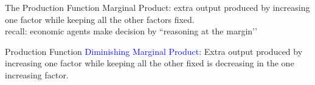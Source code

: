 \documentclass[notes,11pt, aspectratio=169, xcolor=table]{beamer}
\begin{document}
\begin{frame}{The Production Function}
  \huge{Marginal Product: extra output produced by increasing one factor while keeping all the other factors fixed.} \\
  \vspace{20pt}
  \Large{recall: economic agents make decision by ``reasoning at the margin’’}
\end{frame}

\begin{frame}{Production Function}
  \Large{\textcolor{blue}{Diminishing Marginal Product}: Extra output produced by increasing one factor
while keeping all the other fixed is decreasing in the one increasing factor.} \\
\end{frame}
\end{document}
